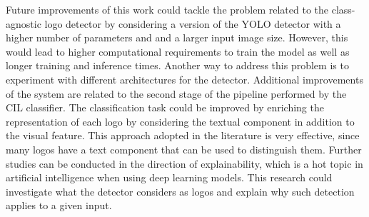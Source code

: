 Future improvements of this work could tackle the problem related to the class-agnostic logo detector by considering a version of the YOLO detector \cite{glenn_jocher_2021_5563715} with a higher number of parameters and and a larger input image size.
However, this would lead to higher computational requirements to train the model as well as longer training and inference times.
Another way to address this problem is to experiment with different architectures for the detector.
Additional improvements of the system are related to the second stage of the pipeline performed by the CIL classifier.
The classification task could be improved by enriching the representation of each logo by considering the textual component in addition to the visual feature.
This approach adopted in the literature is very effective, since many logos have a text component that can be used to distinguish them.
Further studies can be conducted in the direction of explainability, which is a hot topic in artificial intelligence when using deep learning models. This research could investigate what the detector considers as logos and explain why such detection applies to a given input.